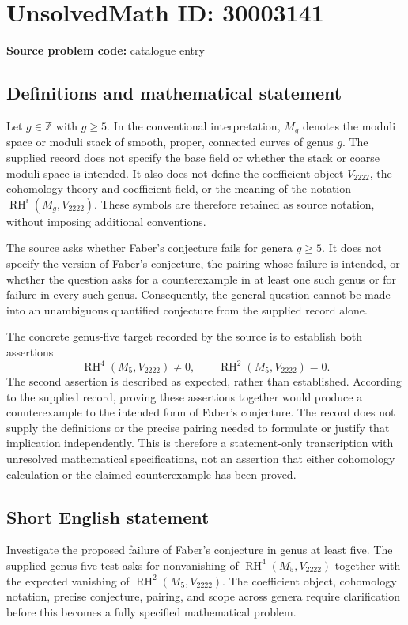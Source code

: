 \documentclass[11pt]{article}
\newcommand{\Z}{\mathbb{Z}}
\begin{document}
\section*{UnsolvedMath ID: 30003141}
\textbf{Source problem code:} catalogue entry
\subsection{Definitions and mathematical statement}
Let \(g\in\Z\) with \(g\geq5\). In the conventional interpretation, \(M_g\) denotes the moduli space or moduli stack of smooth, proper, connected curves of genus \(g\). The supplied record does not specify the base field or whether the stack or coarse moduli space is intended. It also does not define the coefficient object \(V_{2222}\), the cohomology theory and coefficient field, or the meaning of the notation \(\operatorname{RH}^i(M_g,V_{2222})\). These symbols are therefore retained as source notation, without imposing additional conventions.

The source asks whether Faber's conjecture fails for genera \(g\geq5\). It does not specify the version of Faber's conjecture, the pairing whose failure is intended, or whether the question asks for a counterexample in at least one such genus or for failure in every such genus. Consequently, the general question cannot be made into an unambiguous quantified conjecture from the supplied record alone.

The concrete genus-five target recorded by the source is to establish both assertions
\[
\operatorname{RH}^{4}(M_5,V_{2222})\neq0,
\qquad
\operatorname{RH}^{2}(M_5,V_{2222})=0.
\]
The second assertion is described as expected, rather than established. According to the supplied record, proving these assertions together would produce a counterexample to the intended form of Faber's conjecture. The record does not supply the definitions or the precise pairing needed to formulate or justify that implication independently. This is therefore a statement-only transcription with unresolved mathematical specifications, not an assertion that either cohomology calculation or the claimed counterexample has been proved.
\subsection{Short English statement}
Investigate the proposed failure of Faber's conjecture in genus at least five. The supplied genus-five test asks for nonvanishing of \(\operatorname{RH}^{4}(M_5,V_{2222})\) together with the expected vanishing of \(\operatorname{RH}^{2}(M_5,V_{2222})\). The coefficient object, cohomology notation, precise conjecture, pairing, and scope across genera require clarification before this becomes a fully specified mathematical problem.
\end{document}
